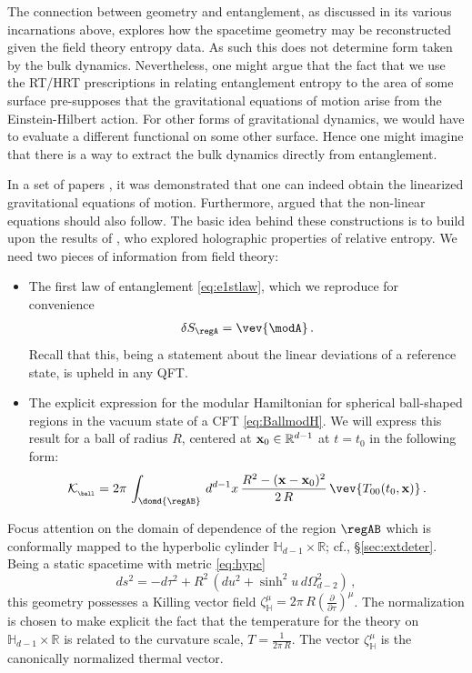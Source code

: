 \documentclass[12pt,openany]{book}
\begin{document}
The connection between geometry and entanglement, as discussed in its various incarnations above, explores how the spacetime geometry may be reconstructed given the field theory entropy data.  As such this does not determine form taken by the bulk dynamics.
Nevertheless, one might argue that the fact that we use the RT/HRT prescriptions in relating entanglement entropy to the area of some surface pre-supposes that the gravitational equations of motion arise from the Einstein-Hilbert action. For other forms of gravitational dynamics, we would have to evaluate a different functional on some other surface.  Hence one might imagine that there is a way to extract the bulk dynamics directly from entanglement.

In a set of  papers \cite{Lashkari:2013koa,Faulkner:2013ica}, it was demonstrated that one can indeed obtain the  linearized gravitational equations of motion. Furthermore, \cite{Swingle:2014uza} argued that the non-linear equations should also follow. The basic idea behind these constructions is to build upon the results of \cite{Blanco:2013joa}, who explored holographic properties of relative entropy.
We need two pieces of information from field theory:
\begin{itemize}
\item The first law of entanglement \eqref{eq:e1stlaw}, which we reproduce for convenience
%
\begin{align}
\delta S_\regA = \vev{\modA} \,.
\label{eq:e1stlaw2}
\end{align}
%
Recall that this, being a statement about the linear deviations of a reference state, is upheld in any QFT.
\item The explicit expression for the modular Hamiltonian for spherical ball-shaped regions in the vacuum state of a CFT \eqref{eq:BallmodH}. We will express this result for a ball of radius $R$, centered at ${\bf x}_0 \in {\mathbb R}^{d-1}$ at $t=t_0$ in the following form:
%
\begin{equation}
{\cal K}_{_{\ball}} = 2\pi\, \int_{\domd{\regAB}} \, d^{d-1}x\, \frac{R^2 - ({\bf x} - {\bf x}_0)^2}{2\, R} \, \vev{T_{00}(t_0,{\bf x})} \,.
\label{eq:kball2}
\end{equation}
%
\end{itemize}

Focus attention on the domain of dependence of the region $\regAB $ which is conformally mapped to the hyperbolic cylinder $\mathbb{H}_{d-1} \times {\mathbb R}$; cf., \S\ref{sec:extdeter}. Being a static spacetime with metric \eqref{eq:hypc}
%
\begin{equation}
ds^2 = - d\tau^2 + R^2 \, \left(du^2 + \sinh^2 u \, d\Omega_{d-2}^2\right) \,,
\label{}
\end{equation}
%
this geometry possesses a Killing vector field $\zeta^\mu_{\mathbb{H}} = 2\pi\,R \left(\frac{\partial}{\partial \tau}\right)^\mu$. The normalization is chosen to make explicit the fact that the temperature for the theory on $\mathbb{H}_{d-1} \times \mathbb{R}$ is related to the curvature scale, $T = \frac{1}{2\pi\,R}$. The vector $\zeta^\mu_{\mathbb{H}} $ is the canonically normalized thermal vector.
\end{document}
